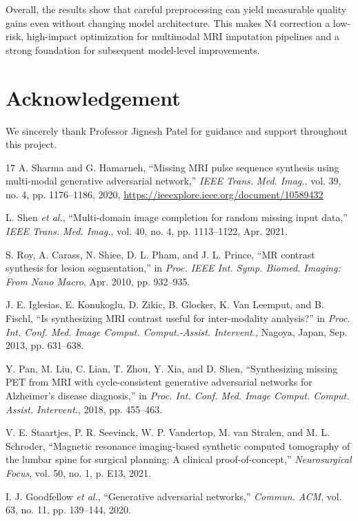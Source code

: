 \documentclass[conference]{IEEEtran}
\begin{document}
Overall, the results show that careful preprocessing can yield measurable quality gains even without changing model architecture. This makes N4 correction a low-risk, high-impact optimization for multimodal MRI imputation pipelines and a strong foundation for subsequent model-level improvements.

\section*{Acknowledgement}
We sincerely thank Professor Jignesh Patel for guidance and support throughout this project.

\begin{thebibliography}{17}
A. Sharma and G. Hamarneh, ``Missing MRI pulse sequence synthesis using multi-modal generative adversarial network,'' \textit{IEEE Trans. Med. Imag.}, vol. 39, no. 4, pp. 1176--1186, 2020, \url{https://ieeexplore.ieee.org/document/10589432}

L. Shen \textit{et al.}, ``Multi-domain image completion for random missing input data,'' \textit{IEEE Trans. Med. Imag.}, vol. 40, no. 4, pp. 1113--1122, Apr. 2021.

S. Roy, A. Carass, N. Shiee, D. L. Pham, and J. L. Prince, ``MR contrast synthesis for lesion segmentation,'' in \textit{Proc. IEEE Int. Symp. Biomed. Imaging: From Nano Macro}, Apr. 2010, pp. 932--935.

J. E. Iglesias, E. Konukoglu, D. Zikic, B. Glocker, K. Van Leemput, and B. Fischl, ``Is synthesizing MRI contrast useful for inter-modality analysis?'' in \textit{Proc. Int. Conf. Med. Image Comput. Comput.-Assist. Intervent.}, Nagoya, Japan, Sep. 2013, pp. 631--638.

Y. Pan, M. Liu, C. Lian, T. Zhou, Y. Xia, and D. Shen, ``Synthesizing missing PET from MRI with cycle-consistent generative adversarial networks for Alzheimer's disease diagnosis,'' in \textit{Proc. Int. Conf. Med. Image Comput. Comput. Assist. Intervent.}, 2018, pp. 455--463.

V. E. Staartjes, P. R. Seevinck, W. P. Vandertop, M. van Stralen, and M. L. Schroder, ``Magnetic resonance imaging-based synthetic computed tomography of the lumbar spine for surgical planning: A clinical proof-of-concept,'' \textit{Neurosurgical Focus}, vol. 50, no. 1, p. E13, 2021.

I. J. Goodfellow \textit{et al.}, ``Generative adversarial networks,'' \textit{Commun. ACM}, vol. 63, no. 11, pp. 139--144, 2020.


\end{thebibliography}
\end{document}
